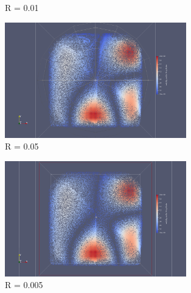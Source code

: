 \documentclass[a4paper,12pt,titlepage]{report}
\begin{document}
\begin{onehalfspace}
\begin{figure}[!h]
\begin{minipage}[c]{.46\linewidth}
        \caption{R = 0.01}
    \end{minipage}
    \hfill%
    \begin{minipage}[c]{.46\linewidth}
        \centering
        \includegraphics[height = 5cm, keepaspectratio]{graphes/Paraview/section_pioncarre_R_005_double.png}
        \caption{R = 0.05}
    \end{minipage}
\end{figure}
\begin{figure}[!h]
    \begin{minipage}[c]{.46\linewidth}
        \centering
        \includegraphics[height = 5cm, keepaspectratio]{graphes/Paraview/section_pioncarre_R_0005_double.png}
        \caption{R = 0.005}
    \end{minipage}
    \hfill%
\end{figure}


\end{onehalfspace}
\end{document}
